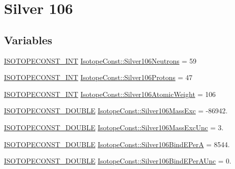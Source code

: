 \hypertarget{group___isotope_const-_silver-_ag106}{}\section{Silver 106}
\label{group___isotope_const-_silver-_ag106}
\subsection*{Variables}
\begin{DoxyCompactItemize}
\item 
\mbox{\hyperlink{group___isotope_const-_macros_ga5f18360b3e99483a35c32d789e62621c}{I\+S\+O\+T\+O\+P\+E\+C\+O\+N\+S\+T\+\_\+\+I\+NT}} \mbox{\hyperlink{group___isotope_const-_silver-_ag106_gaf6bb4c72dc6ccc515da6b12441a94b42}{Isotope\+Const\+::\+Silver106\+Neutrons}} = 59
\item 
\mbox{\hyperlink{group___isotope_const-_macros_ga5f18360b3e99483a35c32d789e62621c}{I\+S\+O\+T\+O\+P\+E\+C\+O\+N\+S\+T\+\_\+\+I\+NT}} \mbox{\hyperlink{group___isotope_const-_silver-_ag106_gae001a542a8c0b66aa5ebc07023591866}{Isotope\+Const\+::\+Silver106\+Protons}} = 47
\item 
\mbox{\hyperlink{group___isotope_const-_macros_ga5f18360b3e99483a35c32d789e62621c}{I\+S\+O\+T\+O\+P\+E\+C\+O\+N\+S\+T\+\_\+\+I\+NT}} \mbox{\hyperlink{group___isotope_const-_silver-_ag106_ga78b376274e4ebc0ef2610f21814eb22a}{Isotope\+Const\+::\+Silver106\+Atomic\+Weight}} = 106
\item 
\mbox{\hyperlink{group___isotope_const-_macros_ga8f45a7272ce02c0b4c65c44636ed719a}{I\+S\+O\+T\+O\+P\+E\+C\+O\+N\+S\+T\+\_\+\+D\+O\+U\+B\+LE}} \mbox{\hyperlink{group___isotope_const-_silver-_ag106_gab01f87a0eff8d471359c509344fb7a6a}{Isotope\+Const\+::\+Silver106\+Mass\+Exc}} = -\/86942.
\item 
\mbox{\hyperlink{group___isotope_const-_macros_ga8f45a7272ce02c0b4c65c44636ed719a}{I\+S\+O\+T\+O\+P\+E\+C\+O\+N\+S\+T\+\_\+\+D\+O\+U\+B\+LE}} \mbox{\hyperlink{group___isotope_const-_silver-_ag106_ga51d3d6ef9f353ab6162b0e23103598c4}{Isotope\+Const\+::\+Silver106\+Mass\+Exc\+Unc}} = 3.
\item 
\mbox{\hyperlink{group___isotope_const-_macros_ga8f45a7272ce02c0b4c65c44636ed719a}{I\+S\+O\+T\+O\+P\+E\+C\+O\+N\+S\+T\+\_\+\+D\+O\+U\+B\+LE}} \mbox{\hyperlink{group___isotope_const-_silver-_ag106_ga93e47264f42f6bc52e41c65bd0f2b940}{Isotope\+Const\+::\+Silver106\+Bind\+E\+PerA}} = 8544.
\item 
\mbox{\hyperlink{group___isotope_const-_macros_ga8f45a7272ce02c0b4c65c44636ed719a}{I\+S\+O\+T\+O\+P\+E\+C\+O\+N\+S\+T\+\_\+\+D\+O\+U\+B\+LE}} \mbox{\hyperlink{group___isotope_const-_silver-_ag106_ga43ecf3fad7ab424099ce6d2b403d3106}{Isotope\+Const\+::\+Silver106\+Bind\+E\+Per\+A\+Unc}} = 0.

\end{DoxyCompactItemize}
